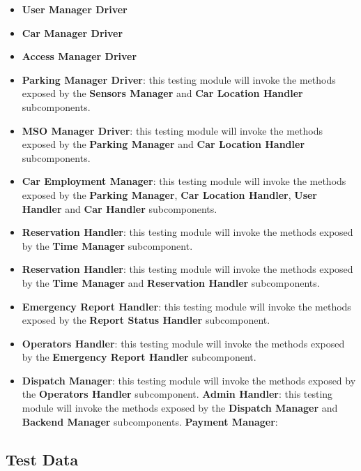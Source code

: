 		\begin{itemize}
			\item \textbf{User Manager Driver} %
			\item \textbf{Car Manager Driver} %
			\item \textbf{Access Manager Driver} %
			\item \textbf{Parking Manager Driver}: this testing module will invoke the methods exposed by the \textbf{Sensors Manager} and \textbf{Car Location Handler} subcomponents. %
			\item \textbf{MSO Manager Driver}: this testing module will invoke the methods exposed by the \textbf{Parking  Manager} and \textbf{Car Location Handler} subcomponents.
			\item \textbf{Car Employment Manager}: this testing module will invoke the methods exposed by the \textbf{Parking  Manager}, \textbf{Car Location Handler}, \textbf{User Handler} and \textbf{Car Handler} subcomponents.
			\item \textbf{Reservation Handler}: this testing module will invoke the methods exposed by the \textbf{Time   Manager} subcomponent.
			\item \textbf{Reservation Handler}: this testing module will invoke the methods exposed by the \textbf{Time   Manager} and \textbf{Reservation Handler} subcomponents.
			\item \textbf{Emergency Report Handler}: this testing module will invoke the methods exposed by the \textbf{Report Status Handler} subcomponent.
			\item \textbf{Operators Handler}: this testing module will invoke the methods exposed by the \textbf{Emergency Report Handler} subcomponent.
			\item \textbf{Dispatch Manager}: this testing module will invoke the methods exposed by the \textbf{Operators Handler} subcomponent.
			\textbf{Admin Handler}: this testing module will invoke the methods exposed by the \textbf{Dispatch Manager} and \textbf{Backend Manager} subcomponents.
			\textbf{Payment Manager}: %
		\end{itemize}
		
		
		\begin{itemize}
		
		\end{itemize}
		
	
	
	
	\subsection{Test Data}
	
